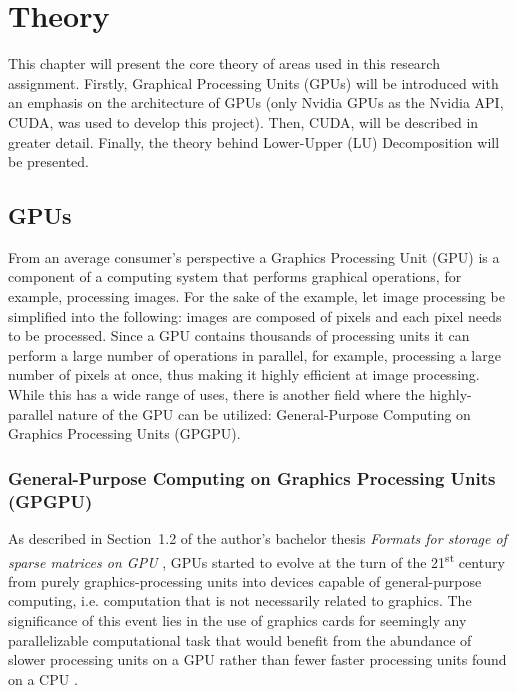 
\chapter{Theory}
This chapter will present the core theory of areas used in this research assignment. Firstly, Graphical Processing Units (GPUs) will be introduced with an emphasis on the architecture of GPUs (only Nvidia GPUs as the Nvidia API, CUDA, was used to develop this project). Then, CUDA, will be described in greater detail. Finally, the theory behind Lower-Upper (LU) Decomposition will be presented.

\section{GPUs}
From an average consumer's perspective a Graphics Processing Unit (GPU) is a component of a computing system that performs graphical operations, for example, processing images. For the sake of the example, let image processing be simplified into the following: images are composed of pixels and each pixel needs to be processed. Since a GPU contains thousands of processing units it can perform a large number of operations in parallel, for example, processing a large number of pixels at once, thus making it highly efficient at image processing. While this has a wide range of uses, there is another field where the highly-parallel nature of the GPU can be utilized: General-Purpose Computing on Graphics Processing Units (GPGPU).

\subsection{General-Purpose Computing on Graphics Processing Units (GPGPU)}
As described in Section~1.2 of the author's bachelor thesis \emph{Formats for storage of sparse matrices on GPU} \cite{Cejka2020}, GPUs started to evolve at the turn of the 21\textsuperscript{st} century from purely graphics-processing units into devices capable of general-purpose computing, i.e. computation that is not necessarily related to graphics. The significance of this event lies in the use of graphics cards for seemingly any parallelizable computational task that would benefit from the abundance of slower processing units on a GPU rather than fewer faster processing units found on a CPU \cite{NVIDIAMay2022}.

